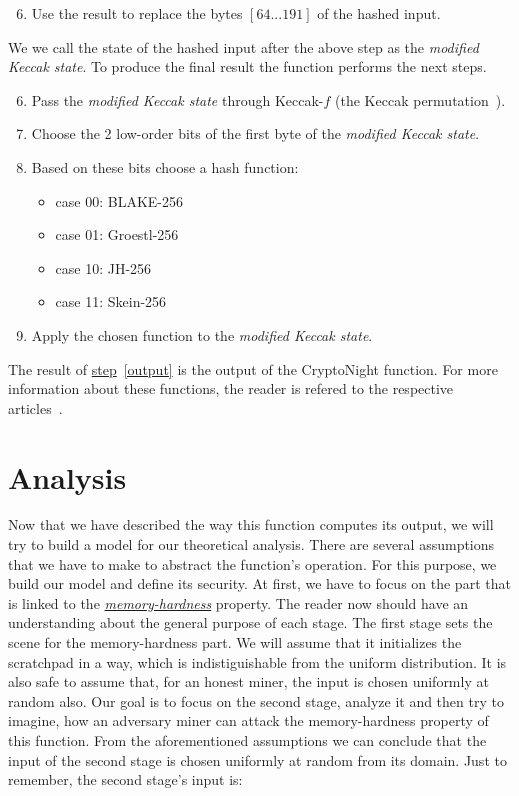 \begin{enumerate}
  \setcounter{enumi}{5}
  \item \label{modified} Use the result to replace the bytes $[64...191]$ of the hashed input.
\end{enumerate}
We we call the state of the hashed input after the above step as the \emph{modified Keccak state}. To produce the final result the function performs the next steps.

\begin{enumerate}
  \setcounter{enumi}{5}
  \item Pass the \emph{modified Keccak state} through Keccak-$f$ (the Keccak permutation~\cite{keccak}).
  \item Choose the 2 low-order bits of the first byte of the \emph{modified Keccak state}.
  \item Based on these bits choose a hash function:
  \begin{itemize}
    \item case 00: BLAKE-256
    \item case 01: Groestl-256
    \item case 10: JH-256
    \item case 11: Skein-256
  \end{itemize}
  \item \label{output} Apply the chosen function to the \emph{modified Keccak state}.
\end{enumerate}
The result of \hyperref[output]{step}~\ref{output} is the output of the CryptoNight function. For more information about these functions, the reader is refered to the respective articles~\cite{10030667226,sha3groestl,sha3W09,sha3F+08}.

\section{Analysis}
Now that we have described the way this function computes its output, we will try to build a model for our theoretical analysis. There are several assumptions that we have to make to abstract the function's operation. For this purpose, we build our model and define its security. At first, we have to focus on the part that is linked to the \hyperref[sec:memory-hard]{\emph{memory-hardness}} property. The reader now should have an understanding about the general purpose of each stage. The first stage sets the scene for the memory-hardness part. We will assume that it initializes the scratchpad in a way, which is indistiguishable from the uniform distribution. It is also safe to assume that, for an honest miner, the input is chosen uniformly at random also. Our goal is to focus on the second stage, analyze it and then try to imagine, how an adversary miner can attack the memory-hardness property of this function. From the aforementioned assumptions we can conclude that the input of the second stage is chosen uniformly at random from its domain. Just to remember, the second stage's input is:

